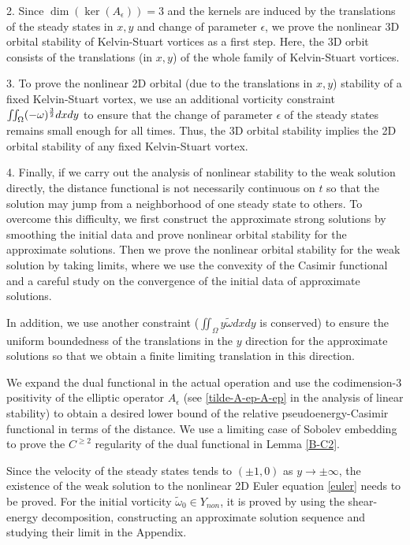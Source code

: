 \documentclass[1 [leqno, 11pt]{amsart}
\numberwithin{equation}{section}
\let\ep=\epsilon
\begin{document}
\begin{CJK*}{GBK}{song}
2. Since $\dim(\ker(A_\ep))=3$ and the kernels are induced by the translations of the steady states  in  $x,y$ and  change of parameter $\ep$,
 we prove the nonlinear 3D orbital stability of Kelvin-Stuart vortices as a first step. Here, the 3D orbit consists of the translations (in $x, y$) of the whole
 family of Kelvin-Stuart vortices.

3. To prove the nonlinear 2D orbital (due to the translations   in  $x,y$) stability of a fixed Kelvin-Stuart vortex, we use an additional vorticity constraint $\iint_{\Omega} (-\omega)^{3\over2} dxdy$ to ensure that  the change of parameter $\ep$ of the steady states  remains small enough for all times.
Thus, the 3D orbital stability implies the 2D orbital stability of any fixed Kelvin-Stuart vortex.

4. Finally, if we carry out  the  analysis of nonlinear  stability to the weak solution directly, the distance functional is not necessarily  continuous on $t$ so that the solution may jump from a neighborhood of one steady state to others. To overcome this difficulty,
    we first  construct the approximate strong solutions by smoothing the initial data and  prove nonlinear orbital stability for the approximate solutions.
Then we prove the nonlinear orbital stability for the weak solution by taking limits, where we  use the convexity of the Casimir functional and a careful study on the convergence of the initial data of approximate solutions.

In addition,  we use another constraint ($\iint_{\Omega}y\tilde \omega dxdy$ is conserved) to ensure the uniform boundedness of the translations in the $y$ direction for the approximate solutions so that we obtain a finite limiting translation in this direction.
\fi

   We expand the dual functional in the actual operation and use the codimension-3 positivity of the elliptic operator $A_\ep$ (see \eqref{tilde-A-ep-A-ep} in the analysis of linear stability) to
obtain a desired  lower bound of the relative pseudoenergy-Casimir functional in terms of the distance. We use a limiting case of Sobolev embedding to prove the $C^{\geq2}$ regularity of the dual functional in Lemma \ref{B-C2}.
\fi



Since the velocity of the steady states tends to $(\pm1,0)$ as $y\to\pm\infty$,
the existence of the weak solution to the nonlinear 2D Euler equation \eqref{euler} needs to be proved.
For the initial vorticity $\tilde \omega_0\in Y_{non}$, it is proved by using the shear-energy decomposition, constructing an  approximate solution sequence and studying their limit in the Appendix.
\fi






\end{CJK*}
\end{document}
